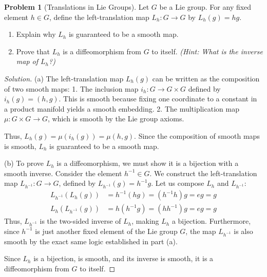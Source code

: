 \documentclass[12pt, a4paper]{article}
\theoremstyle{definition}
\newtheorem{problem}{Problem}
\newenvironment{solution}
  {\renewcommand\qedsymbol{$\blacksquare$}\begin{proof}[Solution]}
  {\end{proof}}
\begin{document}
\vfill\newpage

\begin{problem}[Translations in Lie Groups]
Let $G$ be a Lie group. For any fixed element $h \in G$, define the left-translation map $L_h: G \to G$ by $L_h(g) = hg$.
\begin{enumerate}
    \item[(a)] Explain why $L_h$ is guaranteed to be a smooth map.
    \item[(b)] Prove that $L_h$ is a diffeomorphism from $G$ to itself. \textit{(Hint: What is the inverse map of $L_h$?)}
\end{enumerate}
\end{problem}
\begin{solution}
(a) The left-translation map $L_h(g)$ can be written as the composition of two smooth maps:
1. The inclusion map $i_h: G \to G \times G$ defined by $i_h(g) = (h, g)$. This is smooth because fixing one coordinate to a constant in a product manifold yields a smooth embedding.
2. The multiplication map $\mu: G \times G \to G$, which is smooth by the Lie group axioms.

Thus, $L_h(g) = \mu(i_h(g)) = \mu(h, g)$. Since the composition of smooth maps is smooth, $L_h$ is guaranteed to be a smooth map.

(b) To prove $L_h$ is a diffeomorphism, we must show it is a bijection with a smooth inverse. 
Consider the element $h^{-1} \in G$. We construct the left-translation map $L_{h^{-1}}: G \to G$, defined by $L_{h^{-1}}(g) = h^{-1}g$. 
Let us compose $L_h$ and $L_{h^{-1}}$:
\begin{align*}
L_{h^{-1}}(L_h(g)) &= h^{-1}(hg) = (h^{-1}h)g = eg = g \\
L_h(L_{h^{-1}}(g)) &= h(h^{-1}g) = (hh^{-1})g = eg = g
\end{align*}
Thus, $L_{h^{-1}}$ is the two-sided inverse of $L_h$, making $L_h$ a bijection. Furthermore, since $h^{-1}$ is just another fixed element of the Lie group $G$, the map $L_{h^{-1}}$ is also smooth by the exact same logic established in part (a).

Since $L_h$ is a bijection, is smooth, and its inverse is smooth, it is a diffeomorphism from $G$ to itself.
\end{solution}

\vfill\newpage
\end{document}
